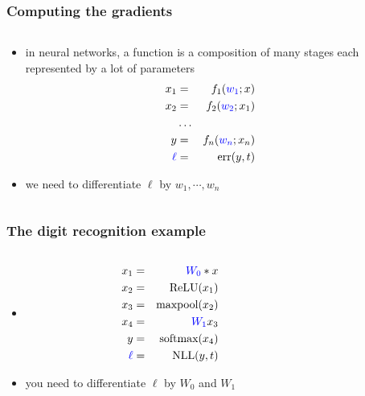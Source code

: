 \documentclass[12pt,dvipdfmx]{beamer}
\newcommand{\ao}[1]{{\color{blue}#1}}
\begin{document}
\begin{frame}
\frametitle{Computing the gradients}
\begin{columns}
\begin{column}{0.6\textwidth}
\begin{itemize}
\item in neural networks, a function is a composition of many stages
each represented by a lot of parameters
\begin{eqnarray*}
x_1 & = & f_1(\ao{w_1}; x) \\
x_2 & = & f_2(\ao{w_2}; x_1) \\
    & \ldots &  \\
 y  & = & f_n(\ao{w_n}; x_n) \\
 \ao{\ell}  & = & \mbox{err}(y, t)
\end{eqnarray*}
\item we need to differentiate \ao{$\ell$} by $w_1, \cdots, w_n$
\end{itemize}
  \end{column}
  
\begin{column}{0.4\textwidth}
\begin{center}
\def\svgwidth{\textwidth}
{\scriptsize}
\end{center}
\end{column}
\end{columns}
\end{frame}


\begin{frame}
\frametitle{The digit recognition example}

\begin{columns}[t]
\begin{column}{0.7\textwidth}
  \begin{itemize}
  \item []
\begin{eqnarray*}
x_1 & = & \ao{W_0} \ast x \\
x_2 & = & \ReLU(x_1) \\
x_3 & = & \maxpool(x_2) \\
x_4 & = & \ao{W_1}x_3 \\
  y & = & \softmax(x_4) \\
\ao{\ell} & = & \nll(y, t)
\end{eqnarray*}
\item [] you need to differentiate \ao{$\ell$}
  by \ao{$W_0$} and \ao{$W_1$}
\end{itemize}
\end{column}

\begin{column}{0.25\textwidth}
\begin{center}
\def\svgwidth{0.7\textwidth}
{\tiny}
\end{center}
\end{column}
\end{columns}
\end{frame}
\end{document}
